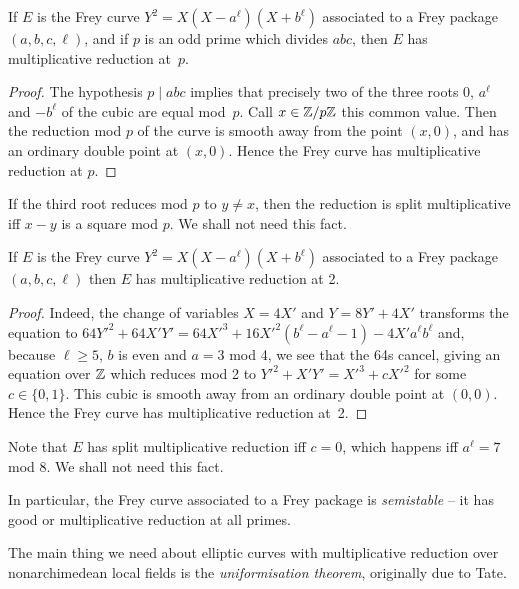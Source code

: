 \begin{lemma}\label{Frey_curve_mult_reduction} If $E$ is the Frey curve $Y^2=X(X-a^\ell)(X+b^\ell)$ associated to a Frey
  package $(a,b,c,\ell)$, and if $p$ is an odd prime
  which divides $abc$, then $E$ has multiplicative reduction at~$p$.
\end{lemma}
\begin{proof} The hypothesis $p\mid abc$ implies that precisely two of the three roots $0$, $a^\ell$ and $-b^\ell$
  of the cubic are equal mod~$p$. Call $x\in\mathbb{Z}/p\mathbb{Z}$ this common value. Then the reduction mod $p$ of 
  the curve is smooth away from the point $(x,0)$,
  and has an ordinary double point at $(x,0)$. Hence the Frey curve has
  multiplicative reduction at $p$.
\end{proof}
\begin{remark} If the third root reduces mod $p$ to $y\not=x$, then the reduction
  is split multiplicative iff $x-y$ is a square mod $p$. We shall not need this fact.
\end{remark}

\begin{lemma}\label{Frey_curve_mult_reduction_at_two} If $E$ is the Frey curve $Y^2=X(X-a^\ell)(X+b^\ell)$ associated to a Frey package
  $(a,b,c,\ell)$ then $E$ has multiplicative reduction at 2. 
\end{lemma}
\begin{proof} Indeed, the change of variables $X=4X'$ 
  and $Y=8Y'+4X'$ transforms the equation to 
  $64Y'^2+64X'Y'=64X'^3+16X'^2(b^\ell-a^\ell-1)-4X'a^\ell b^\ell$ and, because $\ell\geq5$,
  $b$ is even and $a=3$ mod 4, we see that the 64s cancel, giving an equation over $\mathbb{Z}$ which reduces mod 2 to
  $Y'^2+X'Y'=X'^3+cX'^2$ for some $c\in\{0,1\}$. This cubic is smooth away from an ordinary 
  double point at $(0,0)$. Hence the Frey curve has multiplicative reduction at~2.
\end{proof}
\begin{remark} Note that $E$ has split multiplicative reduction iff $c=0$, which happens iff $a^\ell=7$ mod $8$. We shall not need this fact.
\end{remark}

In particular, the Frey curve associated to a Frey package is \emph{semistable} -- it has good or
 multiplicative reduction at all primes.

The main thing we need about elliptic curves with multiplicative reduction over nonarchimedean
local fields is the \emph{uniformisation theorem}, originally due to Tate. 

